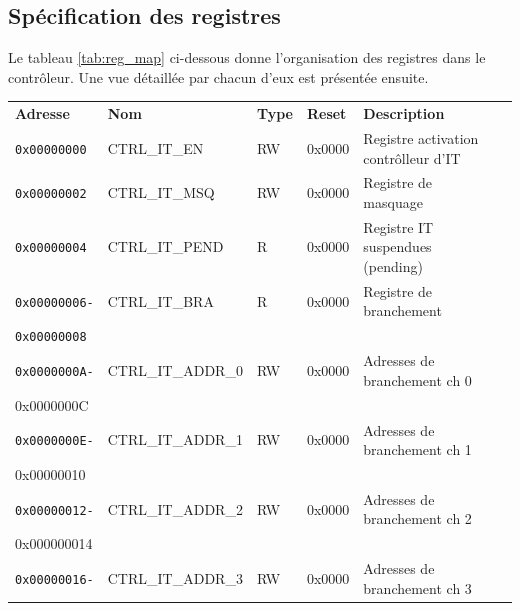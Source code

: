\subsection{Spécification des registres}
Le tableau \ref{tab:reg_map} ci-dessous donne l'organisation des registres dans le contrôleur.
Une vue détaillée par chacun d'eux est présentée ensuite.
\newpage
\begin{table}[H]
	\centering
	\begin{tabular}{llllll}
		\hline
		\addlinespace[1ex] %
		\textbf{Adresse}     & \textbf{Nom}           & \textbf{Type} & \textbf{Reset} & \textbf{Description}                 \\
		\rhline
		\texttt{0x00000000}  & CTRL\_IT\_EN           & RW            & 0x0000         & Registre activation contrôlleur d'IT \\
		\rhline
		\texttt{0x00000002}  & CTRL\_IT\_MSQ          & RW            & 0x0000         & Registre de masquage                 \\
		\rhline
		\texttt{0x00000004}  & CTRL\_IT\_PEND         & R             & 0x0000         & Registre IT suspendues (pending)     \\
		\rhline
		\texttt{0x00000006-} & CTRL\_IT\_BRA          & R             & 0x0000         & Registre de branchement              \\
		\texttt{0x00000008}  &                        &               &                &                                      \\
		\rhline
		\texttt{0x0000000A-} & CTRL\_IT\_ADDR\_0      & RW            & 0x0000         & Adresses de branchement ch 0         \\
		{0x0000000C}         &                        &               &                &                                      \\
		\rhline
		\texttt{0x0000000E-} & CTRL\_IT\_ADDR\_1      & RW            & 0x0000         & Adresses de branchement ch 1         \\
		{0x00000010}         &                        &               &                &                                      \\
		\rhline
		\texttt{0x00000012-} & CTRL\_IT\_ADDR\_2      & RW            & 0x0000         & Adresses de branchement ch 2         \\
		{0x000000014}        &                        &               &                &                                      \\
		\rhline
		\texttt{0x00000016-} & CTRL\_IT\_ADDR\_3      & RW            & 0x0000         & Adresses de branchement ch 3         \\

\end{tabular}
\end{table}
